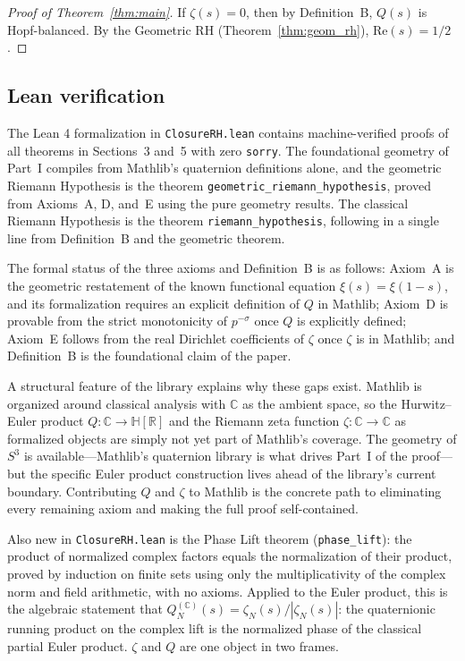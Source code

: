 \documentclass[12pt,a4paper]{article}
\theoremstyle{definition}
\theoremstyle{remark}
\begin{document}
\begin{proof}[Proof of Theorem~\ref{thm:main}]
If $\zeta(s) = 0$, then by Definition~B, $Q(s)$ is Hopf-balanced.
By the Geometric RH (Theorem~\ref{thm:geom_rh}), $\mathrm{Re}(s) = 1/2$.
\end{proof}

\subsection{Lean verification}

The Lean 4 formalization in \texttt{ClosureRH.lean} contains machine-verified
proofs of all theorems in Sections~3 and~5 with zero \texttt{sorry}. The
foundational geometry of Part~I compiles from Mathlib's quaternion definitions
alone, and the geometric Riemann Hypothesis is the theorem
\texttt{geometric\_riemann\_hypothesis}, proved from Axioms~A, D, and~E using
the pure geometry results. The classical Riemann Hypothesis is the theorem
\texttt{riemann\_hypothesis}, following in a single line from Definition~B and
the geometric theorem.

The formal status of the three axioms and Definition~B is as follows: Axiom~A
is the geometric restatement of the known functional equation
$\xi(s) = \xi(1-s)$, and its formalization requires an explicit definition
of $Q$ in Mathlib; Axiom~D is provable from the strict monotonicity of
$p^{-\sigma}$ once $Q$ is explicitly defined; Axiom~E follows from the real
Dirichlet coefficients of $\zeta$ once $\zeta$ is in Mathlib; and
Definition~B is the foundational claim of the paper.

A structural feature of the library explains why these gaps exist. Mathlib
is organized around classical analysis with $\mathbb{C}$ as the ambient
space, so the Hurwitz--Euler product $Q : \mathbb{C} \to \mathbb{H}[\mathbb{R}]$
and the Riemann zeta function $\zeta : \mathbb{C} \to \mathbb{C}$ as
formalized objects are simply not yet part of Mathlib's coverage. The
geometry of $S^3$ is available---Mathlib's quaternion library is what
drives Part~I of the proof---but the specific Euler product construction
lives ahead of the library's current boundary. Contributing $Q$ and $\zeta$
to Mathlib is the concrete path to eliminating every remaining axiom and
making the full proof self-contained.

Also new in \texttt{ClosureRH.lean} is the Phase Lift theorem
(\texttt{phase\_lift}): the product of normalized complex factors equals the
normalization of their product, proved by induction on finite sets using
only the multiplicativity of the complex norm and field arithmetic, with
no axioms. Applied to the Euler product, this is the algebraic statement
that $Q_N^{(\mathbb{C})}(s) = \zeta_N(s) / |\zeta_N(s)|$: the quaternionic
running product on the complex lift is the normalized phase of the classical
partial Euler product. $\zeta$ and $Q$ are one object in two frames.
\end{document}
